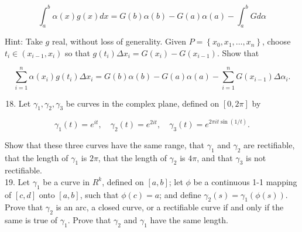 \documentclass[10pt]{article}
\begin{document}
$$
\int_{a}^{b} \alpha(x) g(x) d x=G(b) \alpha(b)-G(a) \alpha(a)-\int_{a}^{b} G d \alpha
$$

Hint: Take $g$ real, without loss of generality. Given $P=\left\{x_{0}, x_{1}, \ldots, x_{n}\right\}$, choose $t_{i} \in\left(x_{i-1}, x_{i}\right)$ so that $g\left(t_{i}\right) \Delta x_{i}=G\left(x_{i}\right)-G\left(x_{i-1}\right)$. Show that

$$
\sum_{i=1}^{n} \alpha\left(x_{i}\right) g\left(t_{i}\right) \Delta x_{i}=G(b) \alpha(b)-G(a) \alpha(a)-\sum_{i=1}^{n} G\left(x_{i-1}\right) \Delta \alpha_{i} .
$$

\begin{enumerate}
  \setcounter{enumi}{17}
  \item Let $\gamma_{1}, \gamma_{2}, \gamma_{3}$ be curves in the complex plane, defined on $[0,2 \pi]$ by
\end{enumerate}

$$
\gamma_{1}(t)=e^{i t}, \quad \gamma_{2}(t)=e^{2 i t}, \quad \gamma_{3}(t)=e^{2 \pi i t \sin (1 / t)} .
$$

Show that these three curves have the same range, that $\gamma_{1}$ and $\gamma_{2}$ are rectifiable, that the length of $\gamma_{1}$ is $2 \pi$, that the length of $\gamma_{2}$ is $4 \pi$, and that $\gamma_{3}$ is not rectifiable.\\
19. Let $\gamma_{1}$ be a curve in $R^{k}$, defined on $[a, b]$; let $\phi$ be a continuous 1-1 mapping of $[c, d]$ onto $[a, b]$, such that $\phi(c)=a$; and define $\gamma_{2}(s)=\gamma_{1}(\phi(s))$. Prove that $\gamma_{2}$ is an arc, a closed curve, or a rectifiable curve if and only if the same is true of $\gamma_{1}$. Prove that $\gamma_{2}$ and $\gamma_{1}$ have the same length.
\end{document}
